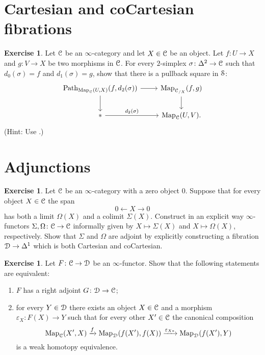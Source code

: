 \documentclass[10pt,a4paper,reqno,oneside]{book} %
\theoremstyle{plain}
\theoremstyle{definition}
\newtheorem{exercise}[thm]{Exercise}
\theoremstyle{remark}
\numberwithin{equation}{section}
\begin{document}
\section{Cartesian and coCartesian fibrations}

\begin{exercise}
	Let $\mathcal C$ be an $\infty$-category and let $X \in \mathcal C$ be an object.
	Let $f \colon U \to X$ and $g \colon V \to X$ be two morphisms in $\mathcal C$.
	For every $2$-simplex $\sigma \colon \Delta^2 \to \mathcal C$ such that $d_0(\sigma) = f$ and $d_1(\sigma) = g$, show that there is a pullback square in $\mathcal S$:
	\[ \begin{tikzcd}
		\mathrm{Path}_{\Map_{\cC}(U,X)}(f, d_2(\sigma)) \arrow{r} \arrow{d} & \mathrm{Map}_{\cC_{/X}}(f,g) \arrow{d} \\
		* \arrow{r}{d_2(\sigma)} & \Map_{\cC}(U,V) .
	\end{tikzcd} \]
	(Hint: Use \cite[Propositions 2.1.2.1 and 2.4.4.2]{HTT}.)
\end{exercise}

\section{Adjunctions}

\begin{exercise}
	Let $\mathcal C$ be an $\infty$-category with a zero object $0$.
	Suppose that for every object $X \in \mathcal C$ the span
	\[ 0 \longleftarrow X \longrightarrow 0 \]
	has both a limit $\Omega(X)$ and a colimit $\Sigma(X)$.
	Construct in an explicit way $\infty$-functors $\Sigma, \Omega \colon \mathcal C \to \mathcal C$ informally given by $X \mapsto \Sigma(X)$ and $X \mapsto \Omega(X)$, respectively.
	Show that $\Sigma$ and $\Omega$ are adjoint by explicitly constructing a fibration $\mathcal D \to \Delta^1$ which is both Cartesian and coCartesian.
\end{exercise}

\begin{exercise}
	Let $F \colon \mathcal C \to \mathcal D$ be an $\infty$-functor.
	Show that the following statements are equivalent:
	\begin{enumerate}
		\item $F$ has a right adjoint $G \colon \mathcal D \to \mathcal C$;
		\item for every $Y \in \mathcal D$ there exists an object $X \in \mathcal C$ and a morphism $\varepsilon_X \colon F(X) \to Y$ such that for every other $X' \in \mathcal C$ the canonical composition
		\[ \operatorname{Map}_{\mathcal C}(X',X) \xrightarrow{f} \operatorname{Map}_{\mathcal D}(f(X'), f(X)) \xrightarrow{\varepsilon_{X*}} \operatorname{Map}_{\mathcal D}(f(X'), Y) \]
		is a weak homotopy equivalence.
	\end{enumerate}
\end{exercise}
\end{document}
